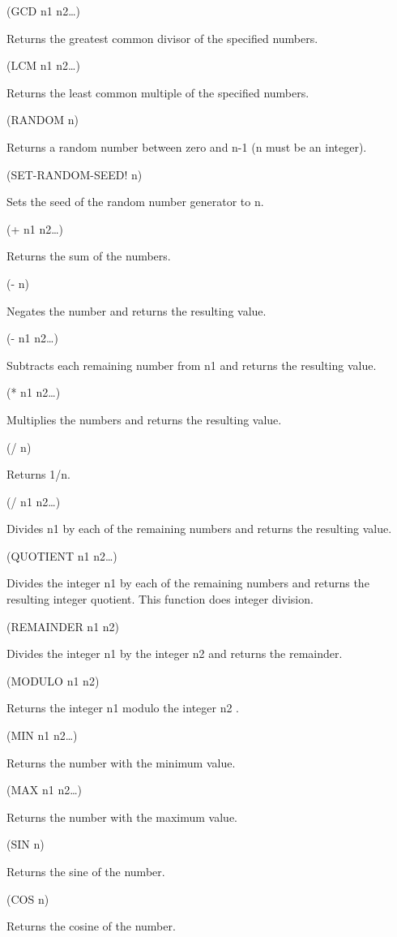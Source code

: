\documentclass[11pt]{article}
\begin{document}
(GCD n1 n2\ldots{})

Returns the greatest common divisor of the specified numbers.

(LCM n1 n2\ldots{})

Returns the least common multiple of the specified numbers.

(RANDOM n)

Returns a random number between zero and n-1 (n must be an integer).

(SET-RANDOM-SEED! n)

Sets the seed of the random number generator to n.

(+ n1 n2\ldots{})

Returns the sum of the numbers.

(- n)

Negates the number and returns the resulting value.

(- n1 n2\ldots{})

Subtracts each remaining number from n1 and returns the resulting value.

(* n1 n2\ldots{})

Multiplies the numbers and returns the resulting value.

(/ n)

Returns 1/n.

(/ n1 n2\ldots{})

Divides n1 by each of the remaining numbers and returns the resulting
value.

(QUOTIENT n1 n2\ldots{})

Divides the integer n1 by each of the remaining numbers and returns the
resulting integer quotient. This function does integer division.

(REMAINDER n1 n2)

Divides the integer n1 by the integer n2 and returns the remainder.

(MODULO n1 n2)

Returns the integer n1 modulo the integer n2 .

(MIN n1 n2\ldots{})

Returns the number with the minimum value.

(MAX n1 n2\ldots{})

Returns the number with the maximum value.

(SIN n)

Returns the sine of the number.

(COS n)

Returns the cosine of the number.
\end{document}
